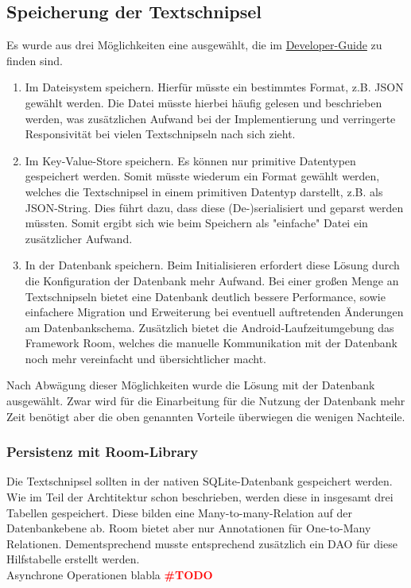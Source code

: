 \documentclass[11pt]{article}
\begin{document}
	\subsection{Speicherung der Textschnipsel}
		Es wurde aus drei Möglichkeiten eine ausgewählt, die im \href{https://developer.android.com/guide/topics/data/data-storage}{Developer-Guide} zu finden sind.
		\begin{enumerate}
			\item Im Dateisystem speichern. Hierfür müsste ein bestimmtes Format, z.B. JSON gewählt werden. Die Datei müsste hierbei häufig gelesen und beschrieben werden, was zusätzlichen Aufwand bei der Implementierung und verringerte Responsivität bei vielen Textschnipseln nach sich zieht.
			\item Im Key-Value-Store speichern. Es können nur primitive Datentypen gespeichert werden. Somit müsste wiederum ein Format gewählt werden, welches die Textschnipsel in einem primitiven Datentyp darstellt, z.B. als JSON-String. Dies führt dazu, dass diese (De-)serialisiert und geparst werden müssten. Somit ergibt sich wie beim Speichern als "einfache" Datei ein zusätzlicher Aufwand.
			\item In der Datenbank speichern. Beim Initialisieren erfordert diese Lösung durch die Konfiguration der Datenbank mehr Aufwand. Bei einer großen Menge an Textschnipseln bietet eine Datenbank deutlich bessere Performance, sowie einfachere Migration und Erweiterung bei eventuell auftretenden Änderungen am Datenbankschema. Zusätzlich bietet die Android-Laufzeitumgebung das Framework Room, welches die manuelle Kommunikation mit der Datenbank noch mehr vereinfacht und übersichtlicher macht.
		\end{enumerate}
		Nach Abwägung dieser Möglichkeiten wurde die Lösung mit der Datenbank ausgewählt. Zwar wird für die Einarbeitung für die Nutzung der Datenbank mehr Zeit benötigt aber die oben genannten Vorteile überwiegen die wenigen Nachteile.
	
		\subsubsection{Persistenz mit Room-Library}
			Die Textschnipsel sollten in der nativen SQLite-Datenbank gespeichert werden. Wie im Teil der Archtitektur schon beschrieben, werden diese in insgesamt drei Tabellen gespeichert. Diese bilden eine Many-to-many-Relation auf der Datenbankebene ab. Room bietet aber nur Annotationen für One-to-Many Relationen. Dementsprechend musste entsprechend zusätzlich ein DAO für diese Hilfstabelle erstellt werden. \\
			Asynchrone Operationen blabla \textcolor{red}{\textbf{{\LARGE \#TODO}}}
			
\end{document}
